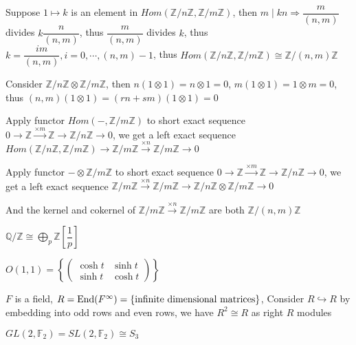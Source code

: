 \documentclass[main]{subfiles}
\begin{document}
\begin{example}
Suppose $1\mapsto k$ is an element in $Hom(\mathbb Z/n\mathbb Z,\mathbb Z/m\mathbb Z)$, then $m\mid kn\Rightarrow \dfrac{m}{(n,m)}$ divides $k\dfrac{n}{(n,m)}$, thus $\dfrac{m}{(n,m)}$ divides $k$, thus $k=\dfrac{im}{(n,m)}, i=0,\cdots,(n,m)-1$, thus $Hom(\mathbb Z/n\mathbb Z,\mathbb Z/m\mathbb Z)\cong\mathbb Z/(n,m)\mathbb Z$ \par
Consider $\mathbb Z/n\mathbb Z\otimes\mathbb Z/m\mathbb Z$, then $n(1\otimes1)=n\otimes1=0$, $m(1\otimes1)=1\otimes m=0$, thus $(n,m)(1\otimes1)=(rn+sm)(1\otimes1)=0$ \par
Apply functor $Hom(-,\mathbb Z/m\mathbb Z)$ to short exact sequence $0\to\mathbb Z\xrightarrow{\times m}\mathbb Z\to\mathbb Z/n\mathbb Z\to 0$, we get a left exact sequence $Hom(\mathbb Z/n\mathbb Z,\mathbb Z/m\mathbb Z)\to \mathbb Z/m\mathbb Z\xrightarrow{\times n} \mathbb Z/m\mathbb Z\to0$ \par
Apply functor $-\otimes\mathbb Z/m\mathbb Z$ to short exact sequence $0\to\mathbb Z\xrightarrow{\times m}\mathbb Z\to\mathbb Z/n\mathbb Z\to 0$, we get a left exact sequence $\mathbb Z/m\mathbb Z\xrightarrow{\times n} \mathbb Z/m\mathbb Z\to\mathbb Z/n\mathbb Z\otimes\mathbb Z/m\mathbb Z\to 0$ \par
And the kernel and cokernel of $\mathbb Z/m\mathbb Z\xrightarrow{\times n} \mathbb Z/m\mathbb Z$ are both $\mathbb Z/(n,m)\mathbb Z$
\end{example}

\begin{example}
$\mathbb Q/\mathbb Z\cong\bigoplus_{p}\mathbb Z\left[\dfrac{1}{p}\right]$
\end{example}

\begin{example}
$O(1,1)=\left\{\begin{pmatrix}
\cosh t&\sinh t \\
\sinh t&\cosh t
\end{pmatrix}\right\}$
\end{example}

\begin{example}\label{R^2=R}
$F$ is a field, $R=\operatorname{End}(F^\infty)=\{\text{infinite dimensional matrices}\}$, Consider $R\hookrightarrow R$ by embedding into odd rows and even rows, we have $R^2\cong R$ as right $R$ modules
\end{example}

\begin{example}
$GL(2,\mathbb F_2)=SL(2,\mathbb F_2)\cong S_3$
\end{example}
\end{document}

